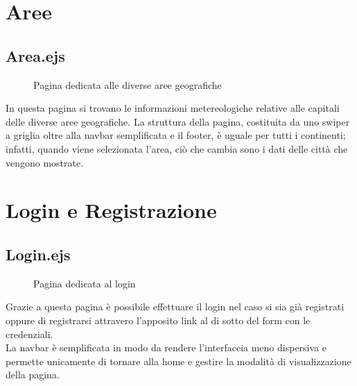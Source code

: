 \section{Aree}

\subsection{Area.ejs}

\begin{figure}[ht]
    \centering
    \caption{Pagina dedicata alle diverse aree geografiche}
\end{figure}

In questa pagina si trovano le informazioni metereologiche relative alle capitali delle diverse aree geografiche. La struttura della pagina, costituita da uno swiper a griglia oltre alla navbar semplificata e il footer, è uguale
per tutti i continenti; infatti, quando viene selezionata l'area, ciò che cambia sono i dati delle città che vengono mostrate.

\newpage
\section{Login e Registrazione}

\subsection{Login.ejs}

\begin{figure}[ht]
    \centering
    \caption{Pagina dedicata al login}
\end{figure}

Grazie a questa pagina è possibile effettuare il login nel caso si sia già registrati oppure di registrarsi attravero l'apposito
link al di sotto del form con le credenziali.\\
La navbar è semplificata in modo da rendere l'interfaccia meno dispersiva e permette unicamente di tornare alla home e gestire
la modalità di visualizzazione della pagina.

